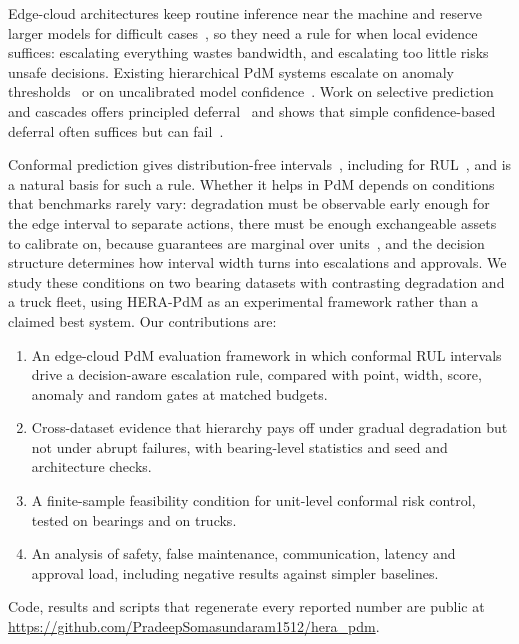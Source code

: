 \documentclass[conference]{IEEEtran}
\begin{document}
Edge-cloud architectures keep routine inference near the machine and reserve larger models for difficult cases~\cite{ren2021cloudedge}, so they need a rule for when local evidence suffices: escalating everything wastes bandwidth, and escalating too little risks unsafe decisions. Existing hierarchical PdM systems escalate on anomaly thresholds~\cite{saleh2026hama} or on uncalibrated model confidence~\cite{yao2026ecdistill}. Work on selective prediction and cascades offers principled deferral~\cite{geifman2017selective,huang2025cab} and shows that simple confidence-based deferral often suffices but can fail~\cite{jitkrittum2023cascade}.

Conformal prediction gives distribution-free intervals~\cite{romano2019cqr,barber2021jackknife}, including for RUL~\cite{javanmardi2023conformal,wang2026conformal}, and is a natural basis for such a rule. Whether it helps in PdM depends on conditions that benchmarks rarely vary: degradation must be observable early enough for the edge interval to separate actions, there must be enough exchangeable assets to calibrate on, because guarantees are marginal over units~\cite{foygel2021limits,dunn2023hierarchical}, and the decision structure determines how interval width turns into escalations and approvals. We study these conditions on two bearing datasets with contrasting degradation and a truck fleet, using HERA-PdM as an experimental framework rather than a claimed best system. Our contributions are:
\begin{enumerate}
\item An edge-cloud PdM evaluation framework in which conformal RUL intervals drive a decision-aware escalation rule, compared with point, width, score, anomaly and random gates at matched budgets.
\item Cross-dataset evidence that hierarchy pays off under gradual degradation but not under abrupt failures, with bearing-level statistics and seed and architecture checks.
\item A finite-sample feasibility condition for unit-level conformal risk control, tested on bearings and on \flN{} trucks.
\item An analysis of safety, false maintenance, communication, latency and approval load, including negative results against simpler baselines.
\end{enumerate}
Code, results and scripts that regenerate every reported number are public at \url{https://github.com/PradeepSomasundaram1512/hera_pdm}.
\end{document}
